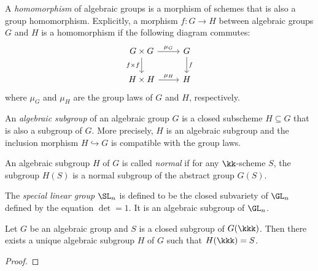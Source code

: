     \begin{definition}\label{def:homomorphism_of_algebraic_groups}
        A \emph{homomorphism} of algebraic groups is a morphism of schemes that is also a group homomorphism.
        Explicitly, a morphism \(f: G \to H\) between algebraic groups \(G\) and \(H\) is a homomorphism if the following diagram commutes:
        \[
            \begin{tikzcd}
                G \times G \arrow{r}{\mu_G} \arrow[d, "f\times f" swap] & G \arrow{d}{f} \\
                H \times H \arrow{r}{\mu_H} & H
            \end{tikzcd}
        \]
        where \(\mu_G\) and \(\mu_H\) are the group laws of \(G\) and \(H\), respectively.
    \end{definition}

    \begin{definition}\label{def:algebraic_subgroup}
        An \emph{algebraic subgroup} of an algebraic group \(G\) is a closed subscheme \(H \subseteq G\) that is also a subgroup of \(G\).
        More precisely, \(H\) is an algebraic subgroup and the inclusion morphism \(H \hookrightarrow G\) is compatible with the group laws.

        An algebraic subgroup \(H\) of \(G\) is called \emph{normal} if for any \(\kk\)-scheme \(S\), the subgroup \(H(S)\) is a normal subgroup of the abstract group \(G(S)\).
    \end{definition}



    \begin{example}\label{eg:special_linear_group}
        The \emph{special linear group} $\SL_n$ is defined to be the closed subvariety of $\GL_n$ defined by the equation \(\det = 1\).
        It is an algebraic subgroup of \(\GL_n\).
    \end{example}

    \begin{proposition}\label{prop:algebraic_group_and_its_closed_points}
        Let \(G\) be an algebraic group and \(S\) is a closed subgroup of \(G(\kkk)\).
        Then there exists a unique algebraic subgroup \(H\) of \(G\) such that \(H(\kkk) = S\).
    \end{proposition}
    \begin{proof}
    \end{proof}

